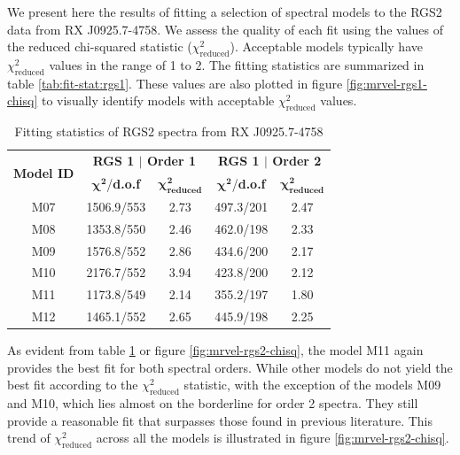 			We present here the results of fitting a selection of spectral models to the RGS2 data from RX J0925.7-4758. We assess the quality of each fit using the values of the reduced chi-squared statistic ($\chi^2_\text{reduced}$). Acceptable models typically have $\chi^2_\text{reduced}$ values in the range of 1 to 2. The fitting statistics are summarized in table \ref{tab:fit-stat:rgs1}.  These values are also plotted in figure \ref{fig:mrvel-rgs1-chisq} to visually identify models with acceptable $\chi^2_\text{reduced}$ values.
			\begin{table}[!htb]
				\centering
				\caption{Fitting statistics of RGS2 spectra from RX J0925.7-4758}
				\label{tab:fit-stat:rgs2}
				\begin{tabular}{c|cc|cc}
					\hline
					\multirow{2}{*}{\textbf{Model ID}} & \multicolumn{2}{c|}{\textbf{RGS 1 $\vert$ Order 1}} & \multicolumn{2}{c}{\textbf{RGS 1 $\vert$ Order 2}} \\ \cline{2-5} & {$\boldsymbol{\chi^2}$/\textbf{d.o.f}} & {$\boldsymbol{\chi^2_\text{reduced}}$} & {$\boldsymbol{\chi^2}$/\textbf{d.o.f}} & {$\boldsymbol{\chi^2_\text{reduced}}$} \\ \hline
					{M07} & {1506.9/553} & {2.73} & {497.3/201} & {2.47} \\
					{M08} & {1353.8/550} & {2.46} & {462.0/198} & {2.33} \\
					{M09} & {1576.8/552} & {2.86} & {434.6/200} & {2.17} \\
					{M10} & {2176.7/552} & {3.94} & {423.8/200} & {2.12} \\
					{M11} & {1173.8/549} & {2.14} & {355.2/197} & {1.80} \\
					{M12} & {1465.1/552} & {2.65} & {445.9/198} & {2.25} \\ \hline
				\end{tabular}
			\end{table}
			
			As evident from table \ref{tab:fit-stat:rgs2} or figure \ref{fig:mrvel-rgs2-chisq}, the model M11 again provides the best fit for both spectral orders. While other models do not yield the best fit according to the $\chi^2_\text{reduced}$ statistic, with the exception of the models M09 and M10, which lies almost on the borderline for order 2 spectra. They still provide a reasonable fit that surpasses those found in previous literature. This trend of $\chi^2_\text{reduced}$ across all the models is illustrated in figure \ref{fig:mrvel-rgs2-chisq}.
			
